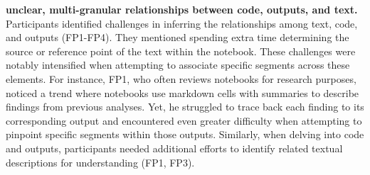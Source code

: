\textbf{ unclear, multi-granular relationships between code, outputs, and text.}
Participants identified challenges in inferring the relationships among text, code, and outputs (FP1-FP4).
They mentioned spending extra time determining the source or reference point of the text within the notebook.
These challenges were notably intensified when attempting to associate specific segments across these elements.
For instance,
FP1, who often reviews notebooks for research purposes, noticed a trend where notebooks use markdown cells with summaries to describe findings from previous analyses. 
Yet, he struggled to trace back each finding to its corresponding output and encountered even greater difficulty when attempting to pinpoint specific segments within those outputs.
Similarly, when delving into code and outputs, participants needed additional efforts to identify related textual descriptions for understanding (FP1, FP3). 


